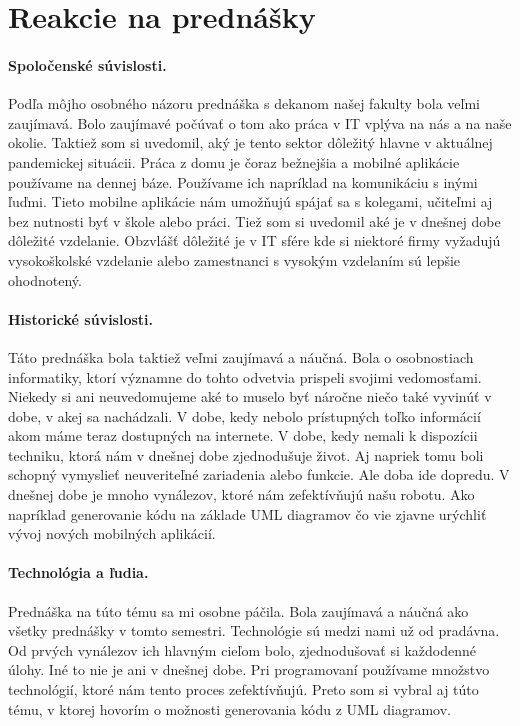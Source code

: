 \documentclass[10pt,twoside,slovak,a4paper]{article}
\begin{document}
\section{Reakcie na prednášky} \label{Reakcie na prednášky}

 \paragraph{Spoločenské súvislosti.}Podľa môjho osobného názoru prednáška s dekanom našej fakulty bola veľmi zaujímavá. Bolo zaujímavé počúvať o tom ako práca v IT vplýva na nás a na naše okolie. \newline
Taktiež som si uvedomil, aký je tento sektor dôležitý hlavne v aktuálnej pandemickej situácii. Práca z domu je čoraz bežnejšia a mobilné aplikácie používame na dennej báze. Používame ich napríklad na komunikáciu s inými ľuďmi. Tieto mobilne aplikácie nám umožňujú spájať sa s kolegami, učiteľmi aj bez nutnosti byť v škole alebo práci.\newline
Tiež som si uvedomil aké je v dnešnej dobe dôležité vzdelanie. Obzvlášť dôležité je v IT sfére kde si niektoré firmy vyžadujú vysokoškolské vzdelanie alebo zamestnanci s vysokým vzdelaním sú lepšie ohodnotený.

 
 \paragraph{Historické súvislosti.}Táto prednáška bola taktiež veľmi zaujímavá a náučná. Bola o osobnostiach informatiky, ktorí významne do tohto odvetvia prispeli svojimi vedomosťami. Niekedy si ani neuvedomujeme aké to muselo byť náročne niečo také vyvinúť v dobe, v akej sa nachádzali. V dobe, kedy nebolo prístupných toľko informácií akom máme teraz dostupných na internete. V dobe, kedy nemali k dispozícii techniku, ktorá nám v dnešnej dobe zjednodušuje život. Aj napriek tomu boli schopný vymyslieť neuveriteľné zariadenia alebo funkcie. \newline
 Ale doba ide dopredu. V dnešnej dobe je mnoho vynálezov, ktoré nám zefektívňujú našu robotu. Ako napríklad generovanie kódu na základe UML diagramov čo vie zjavne urýchliť vývoj nových mobilných aplikácií.
 
 \paragraph{Technológia a ľudia.}Prednáška na túto tému sa mi osobne páčila. Bola zaujímavá a náučná ako všetky prednášky v tomto semestri. \newline
Technológie sú medzi nami už od pradávna. Od prvých vynálezov ich hlavným cieľom bolo, zjednodušovať si každodenné úlohy. Iné to nie je ani v dnešnej dobe. Pri programovaní používame množstvo technológií, ktoré nám tento proces zefektívňujú. Preto som si vybral aj túto tému, v ktorej hovorím o možnosti generovania kódu z UML diagramov. 
\end{document}
